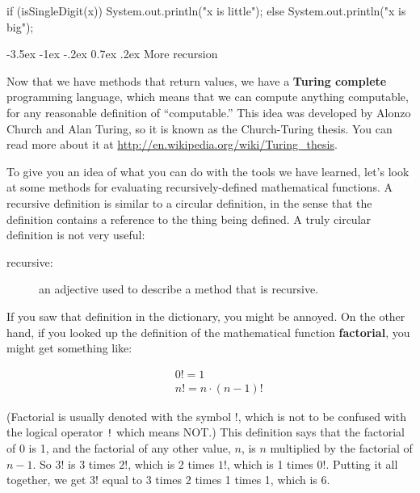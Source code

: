 \documentclass[12pt]{book}
\makeatletter
\renewcommand{\section}{\@startsection {section}{1}{\z@}%
    {-3.5ex \@plus -1ex \@minus -.2ex}%
    {0.7ex \@plus.2ex}%
    {\normalfont\Large\bfseries}}
\theoremstyle{exercise}
\makeatother
\begin{document}
\begin{code}
    if (isSingleDigit(x)) {
        System.out.println("x is little");
    } else {
        System.out.println("x is big");
    }
\end{code}


\section{More recursion}
\label{factorial}



Now that we have methods that return values, we have a {\bf Turing complete} programming language, which means that we can compute anything computable, for any reasonable definition of ``computable.''
This idea was developed by Alonzo Church and Alan Turing, so it is known as the Church-Turing thesis.
You can read more about it at \url{http://en.wikipedia.org/wiki/Turing_thesis}.

To give you an idea of what you can do with the tools we have learned, let's look at some methods for evaluating recursively-defined mathematical functions.
A recursive definition is similar to a circular definition, in the sense that the definition contains a reference to the thing being defined.
A truly circular definition is not very useful:

\begin{description}
\item[recursive:] an adjective used to describe a method that is recursive.
\end{description}

If you saw that definition in the dictionary, you might be annoyed.
On the other hand, if you looked up the definition of the mathematical function {\bf factorial}, you might get something like:

\begin{eqnarray*}
&&  0! = 1 \\
&&  n! = n \cdot(n-1)!
\end{eqnarray*}

(Factorial is usually denoted with the symbol $!$, which is not to be confused with the logical operator {\tt !} which means NOT.)
This definition says that the factorial of 0 is 1, and the factorial of any other value, $n$, is $n$ multiplied by the factorial of $n-1$.  So $3!$ is 3 times $2!$, which is 2 times $1!$, which is 1 times $0!$.
Putting it all together, we get $3!$ equal to 3 times 2 times 1 times 1, which is 6.
\end{document}
